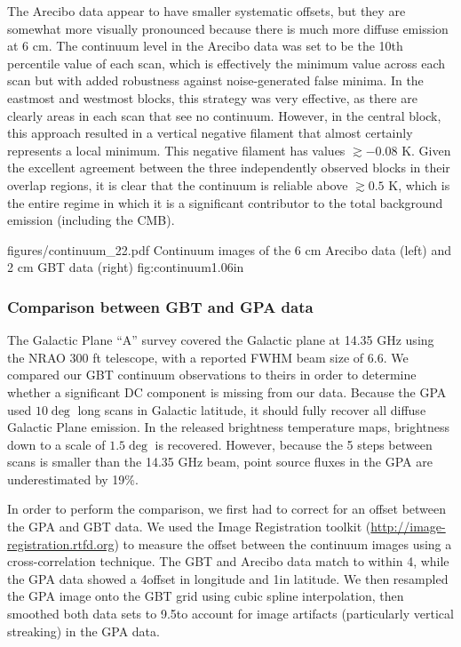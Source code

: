 The Arecibo data appear to have smaller systematic offsets, but they are
somewhat more visually pronounced because there is much more diffuse emission
at 6 cm.  The continuum level in the Arecibo data was set to be the 10th
percentile value of each scan, which is effectively the minimum value across
each scan but with added robustness against noise-generated false minima.  In
the eastmost and westmost blocks, this strategy was very effective, as there
are clearly areas in each scan that see no continuum.  However, in the central
block, this approach resulted in a vertical negative filament that almost
certainly represents a local minimum.  This negative filament has values
$\gtrsim-0.08$ K.  Given the excellent agreement between the three
independently observed blocks in their overlap regions, it is clear that the
continuum is reliable above $\gtrsim0.5$ K, which is the entire regime in which
it is a significant contributor to the total background emission (including the
CMB).

            {figures/continuum_22.pdf}
{Continuum images of the 6 cm Arecibo data (left) and 2 cm GBT data (right)}
{fig:continuum}{1.0}{6in}


\subsubsection{Comparison between GBT and GPA data}
\label{sec:gpacompare}
The Galactic Plane ``A'' survey \citep{Langston2000a} covered the Galactic
plane at 14.35 GHz using the NRAO 300 ft telescope, with a reported FWHM beam
size of 6.6\arcmin.  We compared our GBT continuum observations to theirs in
order to determine whether a significant DC component is missing from our data.
Because the GPA used $10\deg$ long scans in Galactic latitude, it should fully
recover all diffuse Galactic Plane emission.  In the released brightness temperature
maps, brightness down to a scale of $1.5\deg$ is recovered.  However, because the
5 \arcmin steps between scans is smaller than the 14.35 GHz beam, point source fluxes
in the GPA are underestimated by 19\%.

In order to perform the comparison, we first had to correct for an offset
between the GPA and GBT data.  We used the Image Registration toolkit
(\url{http://image-registration.rtfd.org}) to measure the offset between the continuum
images using a cross-correlation technique.
The GBT and Arecibo data match to within 4\arcsec, while the GPA data showed
a 4\arcmin offset in longitude and 1\arcmin in latitude.  We then resampled
the GPA image onto the GBT grid using cubic spline interpolation, then smoothed
both data sets to 9.5\arcmin to account for image artifacts (particularly
vertical streaking) in the GPA data.

